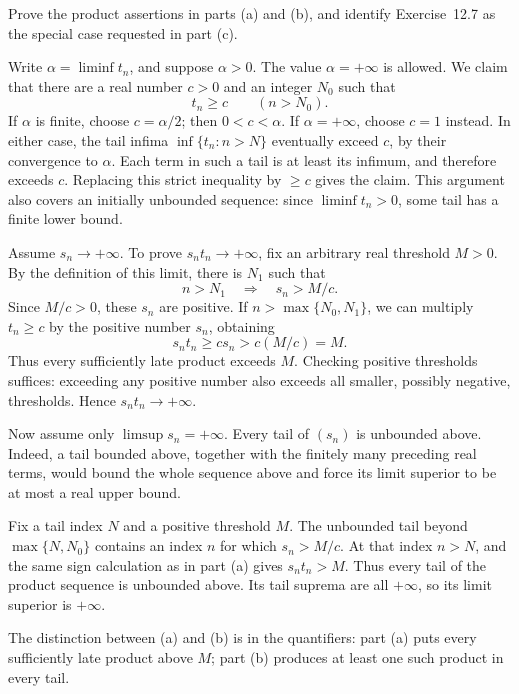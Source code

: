 \goal Prove the product assertions in parts (a) and (b), and identify
Exercise~12.7 as the special case requested in part (c).

Write $\alpha=\liminf t_n$, and suppose $\alpha>0$. The value
$\alpha=+\infty$ is allowed. We claim that there are a real number
$c>0$ and an integer $N_0$ such that
\[
 t_n\ge c\qquad(n>N_0).
\]
If $\alpha$ is finite, choose $c=\alpha/2$; then $0<c<\alpha$.
If $\alpha=+\infty$, choose $c=1$ instead. In either case, the tail
infima $\inf\{t_n:n>N\}$ eventually exceed $c$, by their convergence
to $\alpha$. Each term in such a tail is at least its infimum, and
therefore exceeds $c$. Replacing this strict inequality by $\ge c$
gives the claim. This argument also covers an initially unbounded
sequence: since $\liminf t_n>0$, some tail has a finite lower bound.

Assume $s_n\to+\infty$. To prove $s_nt_n\to+\infty$, fix an
arbitrary real threshold $M>0$. By the definition of this limit,
there is $N_1$ such that
\[
 n>N_1\quad\Longrightarrow\quad s_n>M/c.
\]
Since $M/c>0$, these $s_n$ are positive. If
$n>\max\{N_0,N_1\}$, we can multiply $t_n\ge c$ by the positive
number $s_n$, obtaining
\[
 s_nt_n\ge cs_n>c(M/c)=M.
\]
Thus every sufficiently late product exceeds $M$. Checking positive
thresholds suffices: exceeding any positive number also exceeds all
smaller, possibly negative, thresholds. Hence $s_nt_n\to+\infty$.

Now assume only $\limsup s_n=+\infty$. Every tail of $(s_n)$ is
unbounded above. Indeed, a tail bounded above, together with the
finitely many preceding real terms, would bound the whole sequence
above and force its limit superior to be at most a real upper bound.

Fix a tail index $N$ and a positive threshold $M$. The unbounded
tail beyond $\max\{N,N_0\}$ contains an index $n$ for which
$s_n>M/c$. At that index $n>N$, and the same sign calculation as
in part (a) gives $s_nt_n>M$. Thus every tail of the product sequence
is unbounded above. Its tail suprema are all $+\infty$, so its
limit superior is $+\infty$.

The distinction between (a) and (b) is in the quantifiers: part (a)
puts every sufficiently late product above $M$; part (b) produces
at least one such product in every tail.

